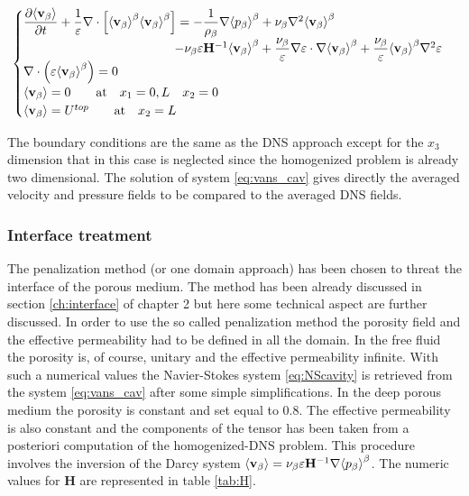 \begin{eqnarray}
\begin{cases}
\dfrac{\partial {\left< \textbf{v}_{\beta} \right>}}{\partial t} + \dfrac{1}{\varepsilon} \nabla \cdot \left[  {\left< \textbf{v}_{\beta} \right>}^{\beta}  {\left< \textbf{v}_{\beta} \right>}^{\beta} \right] = -\dfrac{1}{\rho_{\beta}} \nabla {\left< p_{\beta}\right>}^{\beta} + \nu_{\beta} \nabla^2 {\left< \textbf{v}_{\beta} \right>}^{\beta} \\ 
\qquad \qquad \qquad \qquad \qquad \qquad- \nu_{\beta} \varepsilon \mathbf{H}^{-1} {\left< \textbf{v}_{\beta} \right>}^{\beta} +\dfrac{\nu_{\beta}}{\varepsilon} \nabla \varepsilon \cdot \nabla {\left< \textbf{v}_{\beta} \right>}^{\beta} + \dfrac{\nu_{\beta}}{\varepsilon} {\left< \textbf{v}_{\beta} \right>}^{\beta} \nabla^2 \varepsilon \\
\nabla \cdot \left(\varepsilon {\left< \textbf{v}_{\beta} \right>}^{\beta} \right) = 0\\
{\left< \textbf{v}_{\beta} \right>} = 0 \qquad \textrm{at} \quad x_1 = 0,L \quad x_2 = 0\\
{\left< \textbf{v}_{\beta} \right>} = U^{top} \qquad \textrm{at} \quad x_2 = L
\label{eq:vans_cav}
\end{cases}
\end{eqnarray}

The boundary conditions are the same as the DNS approach except for the $x_3$ dimension that in this case is neglected since the homogenized problem is already two dimensional.
The solution of system \eqref{eq:vans_cav} gives directly the averaged velocity and pressure fields to be compared to the averaged DNS fields.

\subsubsection{Interface treatment}
The penalization method (or one domain approach) has been chosen to threat the interface of the porous medium.
The method has been already discussed in section \ref{ch:interface}  of chapter 2 but here some technical aspect are further discussed.
In order to use the so called penalization method the porosity field and the effective permeability had to be defined in all the domain. In the free fluid the porosity is, of course, unitary and the effective permeability infinite. With such a numerical values the Navier-Stokes system \ref{eq:NScavity} is retrieved from the system \ref{eq:vans_cav} after some simple simplifications.
In the deep porous medium the porosity is constant and set equal to $0.8$. The effective permeability is also constant and the components of the tensor has been taken from a posteriori computation of the homogenized-DNS problem. This procedure involves the inversion of the Darcy system ${\left< \textbf{v}_{\beta} \right>} = \nu_{\beta} \varepsilon \mathbf{H}^{-1} \nabla {\left< p_{\beta}\right>}^{\beta}$. The numeric values for $\mathbf{H}$ are represented in table \ref{tab:H}.


